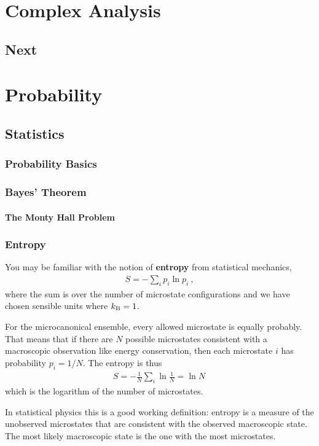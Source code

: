\documentclass[12pt, oneside]{report}    %
\let\oldsection\section
\def\section{%
  \setcounter{sidenote}{1}%
  \oldsection
}
\begin{document}
\part{Complex Analysis}





\chapter{Next}


\part{Probability}


\chapter{Statistics}

\section{Probability Basics}

\section{Bayes' Theorem}

\subsection{The Monty Hall Problem}

\section{Entropy} 

You may be familiar with the notion of \textbf{entropy} from statistical mechanics,
\begin{align}
  S = -\sum_i p_i \ln p_i \ ,
\end{align}
where the sum is over the number of microstate configurations and we have chosen sensible units where $k_\textnormal{B} =1$. 
\begin{example}
For the microcanonical ensemble, every allowed microstate is equally probably. That means that if there are $N$ possible microstates consistent with a macroscopic observation like energy conservation, then each microstate $i$ has probability $p_i = 1/N$. The entropy is thus
\begin{align}
  S = -\frac{1}{N}\sum_i \ln \frac{1}{N} = \ln N \,
\end{align}
which is the logarithm of the number of microstates.
\end{example}
In statistical physics this is a good working definition: entropy is a measure of the unobserved microstates that are consistent with the observed macroscopic state. The most likely macroscopic state is the one with the most microstates. 
\end{document}
